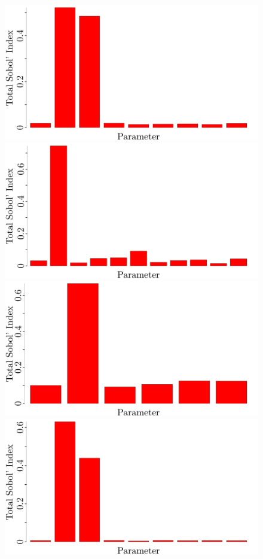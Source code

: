 \documentclass{article}
\begin{document}
\begin{figure}[h]
\begin{center}
\includegraphics[scale=.2]{Figures/Channel_1_Parameters.pdf}
\includegraphics[scale=.2]{Figures/Channel_2_Parameters.pdf}
\includegraphics[scale=.2]{Figures/Channel_3_Parameters.pdf}
\includegraphics[scale=.2]{Figures/Channel_5_Parameters.pdf}

\end{center}
\end{figure}
\end{document}
